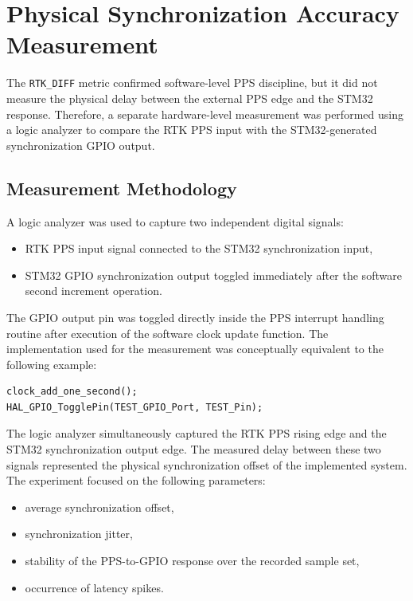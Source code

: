 \section{Physical Synchronization Accuracy Measurement}
\label{sec:physicalAccuracyMeasurement}

The \texttt{RTK\_DIFF} metric confirmed software-level PPS discipline, but it did not measure the physical delay between the external PPS edge and the STM32 response. Therefore, a separate hardware-level measurement was performed using a logic analyzer to compare the RTK PPS input with the STM32-generated synchronization GPIO output.

\subsection{Measurement Methodology}

\noindent A logic analyzer was used to capture two independent digital signals:

\begin{itemize} \item RTK PPS input signal connected to the STM32 synchronization input, \item STM32 GPIO synchronization output toggled immediately after the software second increment operation. \end{itemize}

The GPIO output pin was toggled directly inside the PPS interrupt handling routine after execution of the software clock update function. The implementation used for the measurement was conceptually equivalent to the following example:

\begin{verbatim} 
clock_add_one_second();
HAL_GPIO_TogglePin(TEST_GPIO_Port, TEST_Pin);  
\end{verbatim}

The logic analyzer simultaneously captured the RTK PPS rising edge and the STM32 synchronization output edge. The measured delay between these two signals represented the physical synchronization offset of the implemented system.
\\
The experiment focused on the following parameters:

\begin{itemize} 
\item average synchronization offset, 
\item synchronization jitter, 
\item stability of the PPS-to-GPIO response over the recorded sample set,
\item occurrence of latency spikes. 
\end{itemize}

